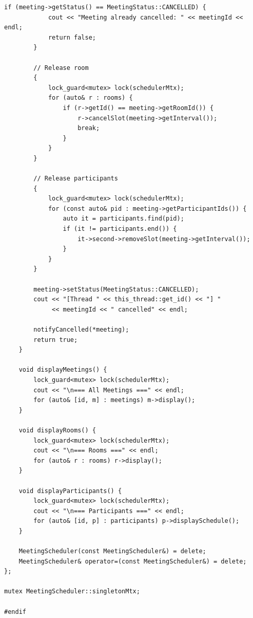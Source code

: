 \documentclass[11pt,a4paper]{article}
\begin{document}
\begin{lstlisting}[title={\texttt{managers.hpp}}]
        if (meeting->getStatus() == MeetingStatus::CANCELLED) {
            cout << "Meeting already cancelled: " << meetingId << endl;
            return false;
        }

        // Release room
        {
            lock_guard<mutex> lock(schedulerMtx);
            for (auto& r : rooms) {
                if (r->getId() == meeting->getRoomId()) {
                    r->cancelSlot(meeting->getInterval());
                    break;
                }
            }
        }

        // Release participants
        {
            lock_guard<mutex> lock(schedulerMtx);
            for (const auto& pid : meeting->getParticipantIds()) {
                auto it = participants.find(pid);
                if (it != participants.end()) {
                    it->second->removeSlot(meeting->getInterval());
                }
            }
        }

        meeting->setStatus(MeetingStatus::CANCELLED);
        cout << "[Thread " << this_thread::get_id() << "] "
             << meetingId << " cancelled" << endl;

        notifyCancelled(*meeting);
        return true;
    }

    void displayMeetings() {
        lock_guard<mutex> lock(schedulerMtx);
        cout << "\n=== All Meetings ===" << endl;
        for (auto& [id, m] : meetings) m->display();
    }

    void displayRooms() {
        lock_guard<mutex> lock(schedulerMtx);
        cout << "\n=== Rooms ===" << endl;
        for (auto& r : rooms) r->display();
    }

    void displayParticipants() {
        lock_guard<mutex> lock(schedulerMtx);
        cout << "\n=== Participants ===" << endl;
        for (auto& [id, p] : participants) p->displaySchedule();
    }

    MeetingScheduler(const MeetingScheduler&) = delete;
    MeetingScheduler& operator=(const MeetingScheduler&) = delete;
};

mutex MeetingScheduler::singletonMtx;

#endif
\end{lstlisting}

\newpage
\end{document}
